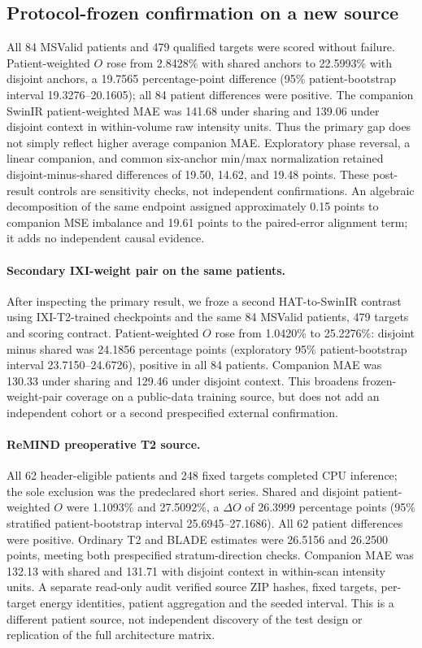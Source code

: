 \documentclass[10pt,twocolumn,letterpaper]{article}
\begin{document}
\subsection{Protocol-frozen confirmation on a new source}
All 84 MSValid patients and 479 qualified targets were scored without failure. Patient-weighted $O$ rose from 2.8428\% with shared anchors to 22.5993\% with disjoint anchors, a 19.7565 percentage-point difference (95\% patient-bootstrap interval 19.3276--20.1605); all 84 patient differences were positive. The companion SwinIR patient-weighted MAE was 141.68 under sharing and 139.06 under disjoint context in within-volume raw intensity units. Thus the primary gap does not simply reflect higher average companion MAE. Exploratory phase reversal, a linear companion, and common six-anchor min/max normalization retained disjoint-minus-shared differences of 19.50, 14.62, and 19.48 points. These post-result controls are sensitivity checks, not independent confirmations. An algebraic decomposition of the same endpoint assigned approximately 0.15 points to companion MSE imbalance and 19.61 points to the paired-error alignment term; it adds no independent causal evidence.

\paragraph{Secondary IXI-weight pair on the same patients.}
After inspecting the primary result, we froze a second HAT-to-SwinIR contrast using IXI-T2-trained checkpoints and the same 84 MSValid patients, 479 targets and scoring contract. Patient-weighted $O$ rose from 1.0420\% to 25.2276\%: disjoint minus shared was 24.1856 percentage points (exploratory 95\% patient-bootstrap interval 23.7150--24.6726), positive in all 84 patients. Companion MAE was 130.33 under sharing and 129.46 under disjoint context. This broadens frozen-weight-pair coverage on a public-data training source, but does not add an independent cohort or a second prespecified external confirmation.

\paragraph{ReMIND preoperative T2 source.}
All 62 header-eligible patients and 248 fixed targets completed CPU inference; the sole exclusion was the predeclared short series. Shared and disjoint patient-weighted $O$ were 1.1093\% and 27.5092\%, a $\Delta O$ of 26.3999 percentage points (95\% stratified patient-bootstrap interval 25.6945--27.1686). All 62 patient differences were positive. Ordinary T2 and BLADE estimates were 26.5156 and 26.2500 points, meeting both prespecified stratum-direction checks. Companion MAE was 132.13 with shared and 131.71 with disjoint context in within-scan intensity units. A separate read-only audit verified source ZIP hashes, fixed targets, per-target energy identities, patient aggregation and the seeded interval. This is a different patient source, not independent discovery of the test design or replication of the full architecture matrix.
\end{document}
